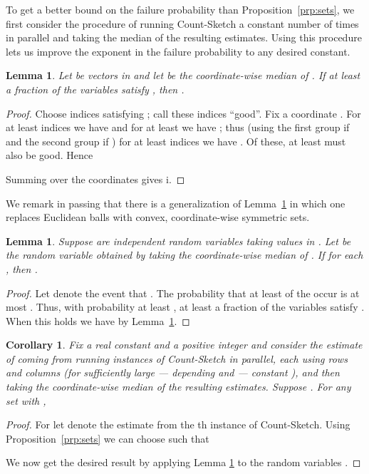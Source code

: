 \documentclass[letterpaper,11pt]{article}
\newtheorem{lemma}[theorem]{Lemma}
\newtheorem{corollary}[theorem]{Corollary}
\begin{document}
To get a better bound on the failure probability than
Proposition~\ref{prp:sets}, we first consider the procedure of
running Count-Sketch a constant number of times in parallel
and taking the median of the resulting estimates.  Using
this procedure lets us improve the exponent in the failure
probability to any desired constant.

\begin{lemma} \label{l:medians}
Let  be vectors in  and let
 be the coordinate-wise median of
.  If at least a  fraction
of the variables  satisfy ,
then .
\end{lemma}
\begin{proof}
Choose  indices  satisfying ;
call these indices ``good''.  Fix a coordinate .
For at least  indices  we have 
and for at least  we have ;
thus (using the first group if  and the
second group if ) for at least  indices
 we have .  Of these, at least
 must also be good.  Hence

Summing over the coordinates  gives
i.
\end{proof}

We remark in passing that there is a generalization of
Lemma~\ref{l:medians} in which one replaces Euclidean
balls with convex, coordinate-wise symmetric sets.

\begin{lemma} \label{l:hack}
Suppose  are independent random variables
taking values in .  Let  be the random variable
obtained by taking the coordinate-wise median of
.  If 
for each , then .
\end{lemma}
\begin{proof}
  Let  denote the event that .  The
  probability that at least  of the  occur is at most
  .  Thus,
  with probability at least , at least a  fraction
  of the variables  satisfy .  When this holds
  we have  by Lemma~\ref{l:medians}.
\end{proof}

\begin{corollary} \label{c:hack} Fix a real constant 
  and a positive integer  and consider the
  estimate  of  coming from running  instances of
  Count-Sketch in parallel, each using  rows and  columns
  (for sufficiently large --- depending  and  --- constant ), and
  then taking the coordinate-wise median of the  resulting
  estimates.  Suppose .  For any set  with ,
  
\end{corollary}
\begin{proof}
  For  let  denote the estimate from
  the th instance of Count-Sketch.  Using Proposition~\ref{prp:sets}
  we can choose  such that
  
   We now get the desired result by applying Lemma \ref{l:hack} to
   the random variables .
\end{proof}
\end{document}
